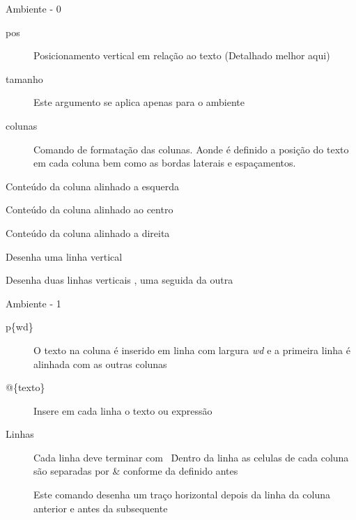 \begin{frame}{Ambiente  - 0}
	\begin{description}
		\item [pos] Posicionamento vertical em relação ao texto (Detalhado melhor aqui) %
		\pause
		\item [tamanho] Este argumento se aplica apenas para o ambiente %
		\pause
		\item [colunas] Comando de formatação das colunas. Aonde é definido a posição do texto em cada coluna bem como as bordas laterais e espaçamentos.
	\end{description}
	
	\begin{description}
		\pause	
		\item [l] Conteúdo da coluna alinhado a esquerda
		\pause
		\item [c] Conteúdo da coluna alinhado ao centro
		\pause
		\item [r] Conteúdo da coluna alinhado a direita
		\pause
		\item [|] Desenha uma linha vertical
		\pause
		\item [||] Desenha duas linhas verticais , uma seguida da outra
	\end{description}
\end{frame}

\begin{frame}{Ambiente  - 1}
	\begin{description}
		\item [p\{wd\}] O texto na coluna é inserido em linha com largura \emph{wd} e a primeira linha é alinhada com as outras colunas
		\pause
		\item [@\{texto\}] Insere em cada linha o texto ou expressão
		\pause
		\item [Linhas] Cada linha deve terminar com \string\ \string\. Dentro da linha as celulas de cada coluna são separadas por \& conforme da definido antes
		\pause
		\item [\string\hline] Este comando desenha um traço horizontal depois da linha da coluna anterior e antes da subsequente
		
	\end{description}
\end{frame}

